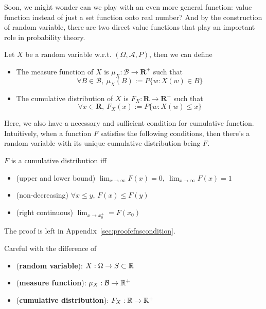 \documentclass[Probability_Theory.tex]{subfiles}
\begin{document}
Soon, we might wonder can we play with an even more general function: value function instead of just a set function onto real number? And by the construction of random variable, there are two direct value functions that play an important role in probability theory.
\begin{theorem}
	Let $X$ be a random variable w.r.t. $(\Omega,\mathcal{A},P)$, then we can define
	\begin{itemize}
		\item The measure function of $X$ is $\mu_X:\mathcal{B}\rightarrow\mathbf{R}^+$ such that $$\forall B\in\mathcal{B},\ \mu_X(B):=P\{w:X(w)\in B\}$$
		\item The cumulative distribution of $X$ is $F_X:\mathbf{R}\rightarrow\mathbf{R}^+$ such that $$\forall x\in\mathbf{R},\ F_X(x):=P\{w:X(w)\leq x \}$$
	\end{itemize}
\end{theorem}

Here, we also have a necessary and sufficient condition for cumulative function. Intuitively, when a function $F$ satisfies the following conditions, then there's a random variable with its unique cumulative distribution being $F$.

\begin{theorem}
	$F$ is a cumulative distribution iff
	\begin{itemize}
		\item (upper and lower bound) $\lim_{x\rightarrow\infty}F(x)=0,\ \lim_{x\rightarrow\infty}F(x) = 1$
		\item (non-decreasing) $\forall x\leq y$, $F(x)\leq F(y)$
		\item (right continuous) $\lim_{x\rightarrow x_0^+} = F(x_0)$
	\end{itemize}
\end{theorem}
The proof is left in Appendix~\ref{sec:proofcfnscondition}.


\begin{intuition}
	Careful with the difference of 
	\begin{itemize}
		\item ({\bf random variable}): $X:\Omega\rightarrow S\subset{\mathbb R}$
		\item ({\bf measure function}): $\mu_X:\mathcal{B}\rightarrow{\mathbb R}^+$
		\item ({\bf cumulative distribution}): $F_X:{\mathbb R}\rightarrow{\mathbb R}^+$
	\end{itemize}
\end{intuition}
\end{document}
